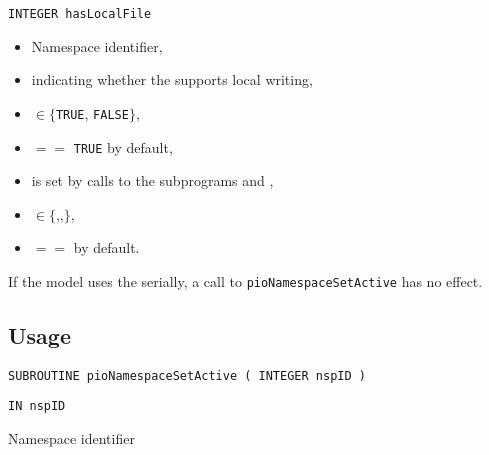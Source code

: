 \hspace*{4mm}\begin{minipage}[]{15cm}
\begin{deflist}{\tt INTEGER hasLocalFile\ } 
\item[{\tt INTEGER nspID}] 
\begin{itemize}
\item[] Namespace identifier,
\end{itemize}
\item[{\tt INTEGER hasLocalFile}]
\begin{itemize}
\item[] indicating whether the {} supports local 
writing,
\item[]$\in \{${\tt TRUE}, {\tt FALSE}$\}$, 
\item[]$==$ {\tt TRUE} by default,
\end{itemize}
\item[{\tt INTEGER stageCode}]
\begin{itemize}
\item[] is set by calls to the subprograms {}
 and {},
\item[]$\in \{${},{},{}$\}$, 
\item[]$==$ {} by default.
\end{itemize}
\end{deflist}
\end{minipage}
\smallskip

 If the model uses the {\CDI} serially, a call to {\tt pioNamespaceSetActive} 
has no effect.\\
\smallskip 

\subsection*{Usage}
\begin{verbatim}
SUBROUTINE pioNamespaceSetActive ( INTEGER nspID )
\end{verbatim}

\hspace*{4mm}\begin{minipage}[]{15cm}
\begin{deflist}{\tt IN  nspID\ } 
\item[{\tt IN  nspID}]
Namespace identifier
\end{deflist}
\end{minipage}


